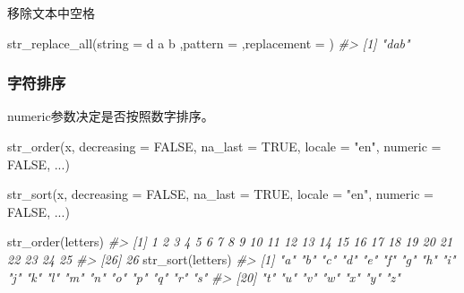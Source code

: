 \documentclass[
]{book}
\newenvironment{Shaded}{\begin{snugshade}}{\end{snugshade}}
\newcommand{\AttributeTok}[1]{\textcolor[rgb]{0.77,0.63,0.00}{#1}}
\newcommand{\CommentTok}[1]{\textcolor[rgb]{0.56,0.35,0.01}{\textit{#1}}}
\newcommand{\ConstantTok}[1]{\textcolor[rgb]{0.00,0.00,0.00}{#1}}
\newcommand{\FunctionTok}[1]{\textcolor[rgb]{0.00,0.00,0.00}{#1}}
\newcommand{\NormalTok}[1]{#1}
\newcommand{\StringTok}[1]{\textcolor[rgb]{0.31,0.60,0.02}{#1}}
\begin{document}
移除文本中空格

\begin{Shaded}
\begin{Highlighting}[]
\FunctionTok{str\_replace\_all}\NormalTok{(}\AttributeTok{string =} \StringTok{\textquotesingle{} d a  b \textquotesingle{}}\NormalTok{,}\AttributeTok{pattern =} \StringTok{\textquotesingle{} \textquotesingle{}}\NormalTok{,}\AttributeTok{replacement =} \StringTok{\textquotesingle{}\textquotesingle{}}\NormalTok{)}
\CommentTok{\#\textgreater{} [1] "dab"}
\end{Highlighting}
\end{Shaded}

\hypertarget{ux5b57ux7b26ux6392ux5e8f}{%
\subsubsection{字符排序}\label{ux5b57ux7b26ux6392ux5e8f}}

numeric参数决定是否按照数字排序。

\begin{Shaded}
\begin{Highlighting}[]
\FunctionTok{str\_order}\NormalTok{(x, }\AttributeTok{decreasing =} \ConstantTok{FALSE}\NormalTok{, }\AttributeTok{na\_last =} \ConstantTok{TRUE}\NormalTok{, }\AttributeTok{locale =} \StringTok{"en"}\NormalTok{,}
  \AttributeTok{numeric =} \ConstantTok{FALSE}\NormalTok{, ...)}

\FunctionTok{str\_sort}\NormalTok{(x, }\AttributeTok{decreasing =} \ConstantTok{FALSE}\NormalTok{, }\AttributeTok{na\_last =} \ConstantTok{TRUE}\NormalTok{, }\AttributeTok{locale =} \StringTok{"en"}\NormalTok{,}
  \AttributeTok{numeric =} \ConstantTok{FALSE}\NormalTok{, ...)}
\end{Highlighting}
\end{Shaded}

\begin{Shaded}
\begin{Highlighting}[]
\FunctionTok{str\_order}\NormalTok{(letters)}
\CommentTok{\#\textgreater{}  [1]  1  2  3  4  5  6  7  8  9 10 11 12 13 14 15 16 17 18 19 20 21 22 23 24 25}
\CommentTok{\#\textgreater{} [26] 26}
\FunctionTok{str\_sort}\NormalTok{(letters)}
\CommentTok{\#\textgreater{}  [1] "a" "b" "c" "d" "e" "f" "g" "h" "i" "j" "k" "l" "m" "n" "o" "p" "q" "r" "s"}
\CommentTok{\#\textgreater{} [20] "t" "u" "v" "w" "x" "y" "z"}
\end{Highlighting}
\end{Shaded}
\end{document}
